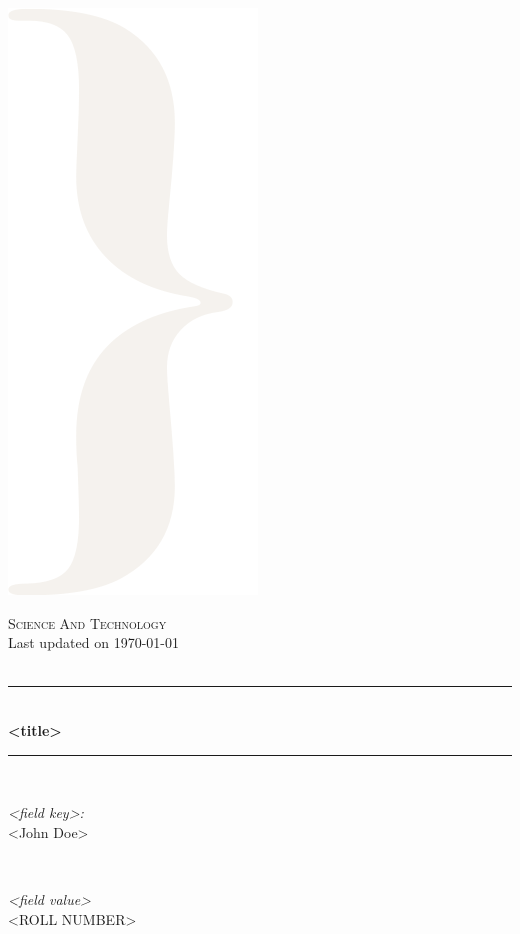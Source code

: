 \begin{titlepage}
    \includegraphics[scale=.15]{images/right.png}
    \vspace{1cm}
    \newcommand{\HRule}{\rule{\linewidth}{0.5mm}}
    \center

    \textsc{\LARGE Science And Technology}\\ [1.0cm]
    {\large Last updated on \today} \\
    \textsc{}\\[0.4cm]
    \HRule \\[0.4cm]
    { \Large \bfseries <title>}\\[0.2cm]
    \HRule \\[0.5cm]
    \begin{center}
    \end{center}
    \begin{minipage}{0.45\textwidth}
        \begin{flushleft} \large
            \emph{<field key>:}\\
            <John Doe>
        \end{flushleft}
    \end{minipage}
    ~
    \begin{minipage}{0.45\textwidth}
        \begin{flushright} \large
            \emph{<field value>} \\
            <ROLL NUMBER>
        \end{flushright}
    \end{minipage}\\[1cm]
    \begin{center}


\end{center}
\end{titlepage}
